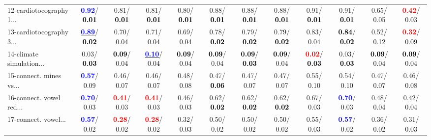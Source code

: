 \begin{table}[h]
\begin{center}
{\begin{tabular}{lc|c|c|c|c|c|c|c|c|c|c}
12-cardiotocography 1... & \textcolor{blue}{\textbf{  0.92}}/\textcolor{black}{\textbf{  0.01}} &   0.81/\textcolor{black}{\textbf{  0.01}} &   0.81/\textcolor{black}{\textbf{  0.01}} &   0.80/\textcolor{black}{\textbf{  0.01}} &   0.88/\textcolor{black}{\textbf{  0.01}} &   0.88/\textcolor{black}{\textbf{  0.01}} &   0.88/\textcolor{black}{\textbf{  0.01}} &   0.91/\textcolor{black}{\textbf{  0.01}} &   0.91/\textcolor{black}{\textbf{  0.01}} &   0.65/  0.05 & \textcolor{red}{\textbf{  0.42}}/  0.03 \\
13-cardiotocography 3... & \underline{\textcolor{blue}{\textbf{  0.89}}}/\textcolor{black}{\textbf{  0.02}} &   0.70/  0.04 &   0.71/  0.04 &   0.69/  0.04 &   0.78/\textcolor{black}{\textbf{  0.02}} &   0.79/\textcolor{black}{\textbf{  0.02}} &   0.79/\textcolor{black}{\textbf{  0.02}} &   0.83/  0.04 & \textcolor{black}{\textbf{  0.84}}/\textcolor{black}{\textbf{  0.02}} &   0.52/  0.12 & \textcolor{red}{\textbf{  0.32}}/  0.09 \\
14-climate simulation... &   0.03/\textcolor{black}{\textbf{  0.03}} & \textcolor{black}{\textbf{  0.09}}/  0.04 & \underline{\textcolor{blue}{\textbf{  0.10}}}/  0.04 & \textcolor{black}{\textbf{  0.09}}/  0.04 & \textcolor{black}{\textbf{  0.09}}/  0.04 & \textcolor{black}{\textbf{  0.09}}/\textcolor{black}{\textbf{  0.03}} & \textcolor{black}{\textbf{  0.09}}/  0.04 & \textcolor{red}{\textbf{  0.02}}/\textcolor{black}{\textbf{  0.03}} &   0.03/\textcolor{black}{\textbf{  0.03}} & \textcolor{black}{\textbf{  0.09}}/  0.04 & \textcolor{black}{\textbf{  0.09}}/  0.04 \\ \hline
15-connect. mines vs... & \textcolor{blue}{\textbf{  0.57}}/  0.09 &   0.46/  0.07 &   0.46/  0.07 &   0.48/  0.08 &   0.47/\textcolor{black}{\textbf{  0.06}} &   0.47/  0.07 &   0.47/  0.07 &   0.55/  0.10 &   0.54/  0.10 &   0.47/  0.07 &   0.46/  0.08 \\
16-connect. vowel red... & \textcolor{blue}{\textbf{  0.70}}/  0.03 & \textcolor{red}{\textbf{  0.41}}/  0.03 & \textcolor{red}{\textbf{  0.41}}/  0.03 &   0.46/  0.03 &   0.62/\textcolor{black}{\textbf{  0.02}} &   0.62/\textcolor{black}{\textbf{  0.02}} &   0.62/\textcolor{black}{\textbf{  0.02}} &   0.67/  0.03 & \textcolor{blue}{\textbf{  0.70}}/  0.03 &   0.48/  0.04 &   0.42/  0.04 \\
17-connect. vowel... & \textcolor{blue}{\textbf{  0.57}}/  0.02 & \textcolor{red}{\textbf{  0.28}}/  0.02 & \textcolor{red}{\textbf{  0.28}}/  0.02 &   0.32/  0.03 &   0.50/  0.02 &   0.50/  0.02 &   0.50/  0.02 &   0.55/  0.03 & \textcolor{blue}{\textbf{  0.57}}/  0.02 &   0.36/  0.02 &   0.31/  0.03 \\

\end{tabular}}
\end{center}
\end{table}
